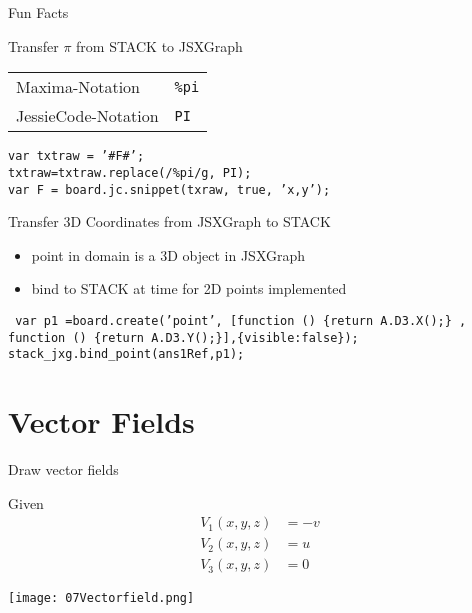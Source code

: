 \begin{frame} [t]{Fun Facts}
\begin{block}{Transfer \(\pi\) from STACK to JSXGraph}
\begin{tabular}{ll}
Maxima-Notation &\texttt{\%pi}\\
JessieCode-Notation& \texttt{PI}
\end{tabular}		

\end{block}

\begin{example}[Code]
\texttt{var txtraw = '{\#F\#}';\\
		                               txtraw=txtraw.replace(/\%pi/g, \grqq{}PI\grqq{});\\
		                               var F =  board.jc.snippet(txraw, true, 'x,y');
}
\end{example}

\begin{block}{Transfer 3D Coordinates from JSXGraph to STACK }
\begin{itemize}
  \item point in domain is a 3D object in JSXGraph
  \item bind to STACK at time for 2D points implemented
\end{itemize}
\end{block}
\begin{example}
\texttt{%
var p1 =board.create('point', [function () \{return A.D3.X();\} ,\\
\phantom{var p1 =board.create('point', [}function () \{return A.D3.Y();\}],\{visible:false\});\\
		stack\_jxg.bind\_point(ans1Ref,p1);
}
\end{example}


\end{frame}

\section{Vector Fields}

\begin{frame} [t]{Draw vector fields}

\begin{minipage}[b]{12cm}
\begin{example}
Given           \begin{align*} V_1(x,y,z)& = -v \\
        V_2(x,y,z)& = u  \\
        V_3(x,y,z)& = 0
        \end{align*}
        \vspace*{15ex}
\end{example}
\end{minipage}\hfill
\begin{minipage}[t]{12cm}
\texttt{[image: 07Vectorfield.png]}
\end{minipage}\hfill\mbox{}
\end{frame} 
